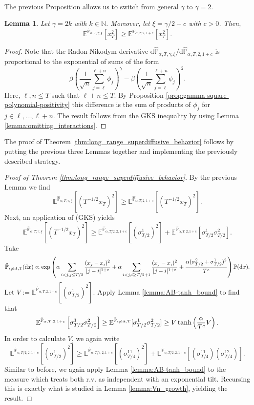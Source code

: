 \documentclass[reqno,11pt]{amsart}
\newcommand{\1}{\mathds{1}}
\theoremstyle{plain}
\newtheorem{lemma}[theorem]{Lemma}
\theoremstyle{definition}
\numberwithin{equation}{section}
\newcommand{\bbE}{{\mathbb E}}
\newcommand{\bbN}{{\mathbb N}}
\newcommand{\bbP}{{\mathbb P}}
\newcommand{\de}{{\mathrm{d}}}
\newcommand{\bbPh}{\hat{\bbP}}
\newcommand{\bbPw}{\Tilde{\bbP}}
\def\lt{\left}
\def\rt{\right}
\begin{document}
The previous Proposition allows us to switch from general $\gamma$ to $\gamma = 2$. 
\begin{lemma}   
    \label{lemma:gamma_two_suffices}
    Let $\gamma = 2k$ with $k \in \bbN$. Moreover, let $\xi = \gamma/2 + c$ with $c> 0$. Then,
    $$\bbE^{\bbPh_{\alpha,T,\gamma,\xi}} [x_T^2] \ge \bbE^{\bbPh_{\alpha,T,2,1+c}} [x_T ^2].$$
\end{lemma}
\begin{proof}
    Note that the Radon-Nikodym derivative
    $ \de \bbPh_{\alpha,T,\gamma,\xi} / \de \bbPh_{\alpha,T,2,1+c} $ is proportional to the exponential of sums of the form
    $$\beta \lt( \frac{1}{\sqrt{n}} \sum\limits_{j=\ell} ^{\ell+n} \phi_j \rt)^\gamma - \beta  \lt( \frac{1}{\sqrt{n}} \sum\limits_{j=\ell}^ {\ell+n} \phi_j \rt)^2.$$
    Here, $\ell,n \le T$ such that $\ell+n \le T$.
    By Proposition \ref{prop:gamma-square-polynomial-positivity} this difference is the sum of products of $\phi_j$ for $j \in \ell,...,\ell+n$. The result follows from the GKS inequality by using Lemma \ref{lemma:omitting_interactions}.
\end{proof}

The proof of Theorem \ref{thm:long_range_superdiffusive_behavior} follows by putting the previous three Lemmas together and implementing the previously described strategy.

\begin{proof}[Proof of Theorem \ref{thm:long_range_superdiffusive_behavior}]
 By the previous Lemma we find  
    $$\bbE^{\hat{\bbP}_{\alpha,T,\gamma,\xi}}\lt[ \lt( T^{-1/2} x_T  \rt)^2 \rt] \ge \bbE^{\hat{\bbP}_{\alpha,T,2,1+c}}\lt[ \lt( T^{-1/2} x_T  \rt)^2 \rt].$$
    Next, an application of (GKS) yields
    $$\bbE^{\hat{\bbP}_{\alpha,T,\gamma,\xi}}\lt[ \lt( T^{-1/2} x_T  \rt)^2 \rt] \ge  \bbE^{\hat{\bbP}_{\alpha,T/2,2,1+c}} \lt[ (\sigma_{T/2} ^{1})^2 \rt] + \bbE^{\hat{\bbP}_{\alpha,T,2,1+c}} \lt[ \sigma_{T/2} ^{1} \sigma_{T/2} ^{2} \rt].$$
    Take
    $$\bbPw_{\mathrm{split,T}}(\de x) \propto \exp \lt(\alpha \sum\limits_{i < j, j \le T/2} \frac{(x_j - x_i)^2}{|j-i|^{1+c}} + \alpha\sum\limits_{i < j, i \ge T/2+1} \frac{(x_j - x_i)^2}{|j-i|^{1+c}} + \frac{\alpha (\sigma_{T/2} ^2 + \sigma_{T/2} ^1 )^2}{T^c} \rt)\bbP(\de x).$$
    Let $V := \bbE^{\bbPh_{\alpha,T,2,1+c}}[ (\sigma_{T/2} ^{1})^2]$.
    Apply Lemma \ref{lemma:AB-tanh_bound} to find that
    $$\bbE^{\hat{\bbP}_{\alpha,T,2,1+c}} \lt[ \sigma_{T/2} ^{1} \sigma_{T/2} ^{2} \rt] \ge \bbE^{\bbPw_{\mathrm{split,T}}}[\sigma_{T/2} ^{1} \sigma_{T/2} ^{2}] \ge V \tanh \lt(\frac{\alpha}{T^c}V \rt).$$
    In order to calculate $V$, we again write
    $$\bbE^{\bbPh_{\alpha,T/2,2,1+c}}[(\sigma_{T/2} ^{1})^2] \ge \bbE^{\bbPh_{\alpha,T/4,2,1+c}} [(\sigma_{T/4} ^{11})^2]  + \bbE^{\bbPh_{\alpha,T/2,2,1+c}}[(\sigma_{T/4} ^{11})(\sigma_{T/4} ^{12})].$$
    Similar to before, we again apply Lemma \ref{lemma:AB-tanh_bound} to the measure which treats both r.v. as independent with an exponential tilt. Recursing this is exactly what is studied in Lemma \ref{lemma:Vn_growth}, yielding the result.
\end{proof}
\end{document}
